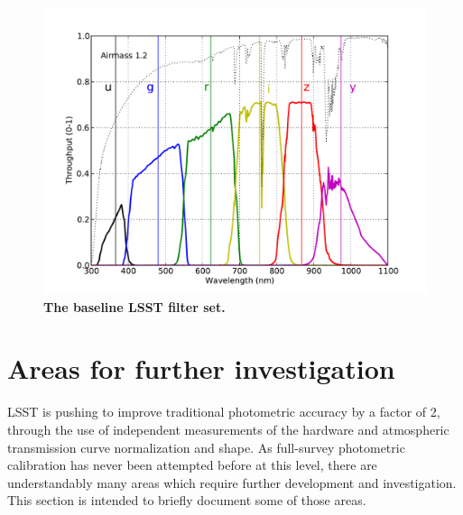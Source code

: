 \documentclass[12pt,preprint]{aastex}
\begin{document}
\begin{figure}[h!]
\centering
\includegraphics[width=5in]{filters}
\caption{{\small {\bf The baseline LSST filter set.}}
\label{fig:filterset}}
\end{figure}


\section{Areas for further investigation}
\label{sec:investigation}

LSST is pushing to improve traditional photometric accuracy by a
factor of 2, through the use of independent measurements of the
hardware and atmospheric transmission curve normalization and
shape. As full-survey photometric calibration has never been attempted
before at this level, there are understandably many areas which
require further development and investigation.  This section is
intended to briefly document some of those areas.
\end{document}
